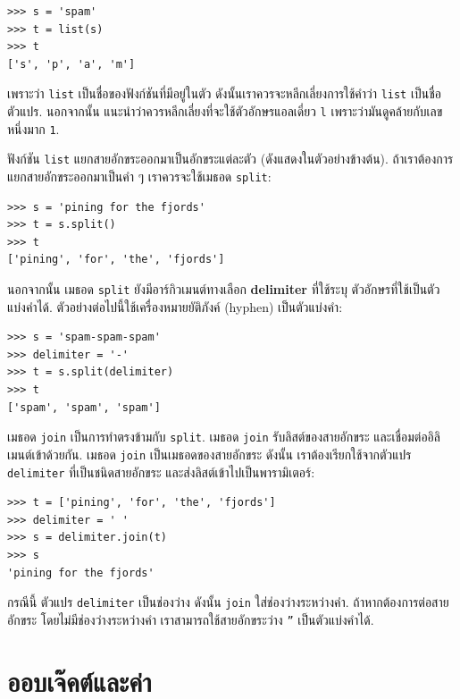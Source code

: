 \begin{verbatim}
>>> s = 'spam'
>>> t = list(s)
>>> t
['s', 'p', 'a', 'm']
\end{verbatim}
%
เพราะว่า \texttt{list} เป็นชื่อของฟังก์ชันที่มีอยู่ในตัว
ดังนั้นเราควรจะหลีกเลี่ยงการใช้คำว่า \texttt{list} เป็นชื่อตัวแปร.
นอกจากนั้น แนะนำว่าควรหลีกเลี่ยงที่จะใช้ตัวอักษรแอลเดี่ยว \texttt{l}
เพราะว่ามันดูคล้ายกับเลขหนึ่งมาก \texttt{1}. 

ฟังก์ชัน \texttt{list} แยกสายอักขระออกมาเป็นอักขระแต่ละตัว (ดังแสดงในตัวอย่างข้างต้น).
ถ้าเราต้องการแยกสายอักขระออกมาเป็นคำ ๆ เราควรจะใช้เมธอด \texttt{split}:
%

\begin{verbatim}
>>> s = 'pining for the fjords'
>>> t = s.split()
>>> t
['pining', 'for', 'the', 'fjords']
\end{verbatim}
%
นอกจากนั้น เมธอด \texttt{split} ยังมีอาร์กิวเมนต์ทางเลือก \textbf{delimiter} ที่ใช้ระบุ
ตัวอักษรที่ใช้เป็นตัวแบ่งคำได้.
ตัวอย่างต่อไปนี้ใช้เครื่องหมายยัติภังค์ (hyphen) เป็นตัวแบ่งคำ:

\begin{verbatim}
>>> s = 'spam-spam-spam'
>>> delimiter = '-'
>>> t = s.split(delimiter)
>>> t
['spam', 'spam', 'spam']
\end{verbatim}
%
เมธอด \texttt{join} เป็นการทำตรงข้ามกับ \texttt{split}.  
เมธอด \texttt{join} รับลิสต์ของสายอักขระ
และเชื่อมต่ออิลิเมนต์เข้าด้วยกัน.
เมธอด \texttt{join} เป็นเมธอดของสายอักขระ
ดังนั้น เราต้องเรียกใช้จากตัวแปร \texttt{delimiter} ที่เป็นชนิดสายอักขระ
และส่งลิสต์เข้าไปเป็นพารามิเตอร์:

\begin{verbatim}
>>> t = ['pining', 'for', 'the', 'fjords']
>>> delimiter = ' '
>>> s = delimiter.join(t)
>>> s
'pining for the fjords'
\end{verbatim}
%
กรณีนี้ ตัวแปร \texttt{delimiter} เป็นช่องว่าง
ดังนั้น \texttt{join} ใส่ช่องว่างระหว่างคำ.
ถ้าหากต้องการต่อสายอักขระ โดยไม่มีช่องว่างระหว่างคำ
เราสามารถใช้สายอักขระว่าง \texttt{''} เป็นตัวแบ่งคำได้. 


\section{ออบเจ๊คต์และค่า}
\label{equivalence}

